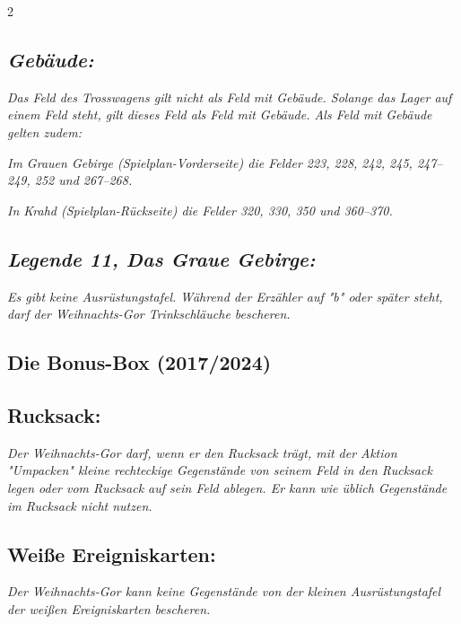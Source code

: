 \documentclass[10pt, a4paper, oneside]{book}
\newcommand{\fan}[1]{\textit{#1}}
\begin{document}
\begin{multicols*}{2}
\begin{bgcolor}
\subsection{\fan{Gebäude:}}

\fan{Das Feld des Trosswagens gilt nicht als Feld mit Gebäude. Solange das Lager auf einem Feld steht, gilt dieses Feld als Feld mit Gebäude. Als Feld mit Gebäude gelten zudem:}

\bullet{} \fan{Im Grauen Gebirge (Spielplan-Vorderseite) die Felder 223, 228, 242, 245, 247–249, 252 und 267–268.}

\bullet{} \fan{In Krahd (Spielplan-Rückseite) die Felder 320, 330, 350 und 360–370.}



\subsection{\fan{Legende 11, Das Graue Gebirge:}}

\fan{Es gibt keine Ausrüstungstafel. Während der Erzähler auf "b" oder später steht, darf der Weihnachts-Gor Trinkschläuche bescheren.}







\end{bgcolor}




\begin{bgcolor}[color-bb]
\section{Die Bonus-Box (2017/2024)}

\subsection{Rucksack:}

\fan{Der Weihnachts-Gor darf, wenn er den Rucksack trägt, mit der Aktion "Umpacken" kleine rechteckige Gegenstände von seinem Feld in den Rucksack legen oder vom Rucksack auf sein Feld ablegen. Er kann wie üblich Gegenstände im Rucksack nicht nutzen.}

\subsection{Weiße Ereigniskarten:}

\fan{Der Weihnachts-Gor kann keine Gegenstände von der kleinen Ausrüstungstafel der weißen Ereigniskarten bescheren.}



\end{bgcolor}
\end{multicols*}
\end{document}
